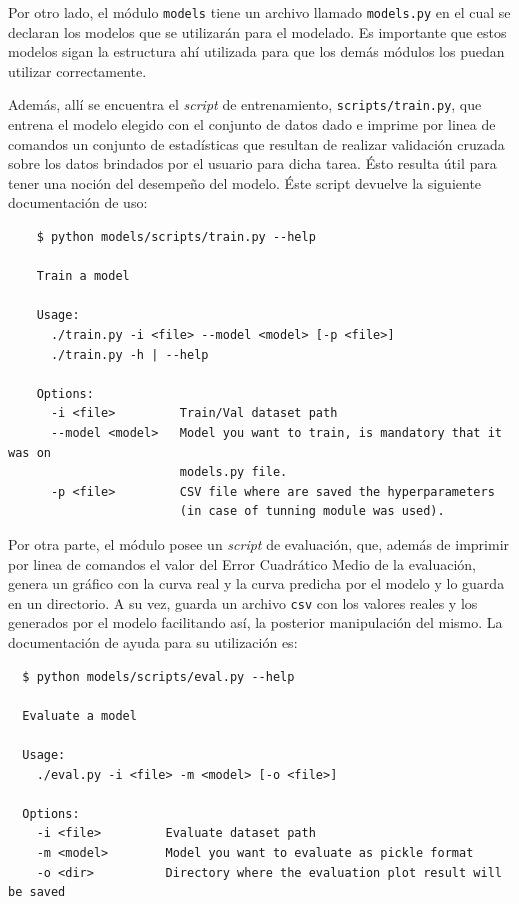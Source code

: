 \begin{appendix}
\begin{lstlisting}
    \end{lstlisting}


  \par Por otro lado, el módulo \verb|models| tiene un archivo llamado
    \verb|models.py| en el cual se declaran los modelos
    que se utilizarán para el modelado. Es importante que estos modelos
    sigan la estructura ahí utilizada para que los demás módulos los
    puedan utilizar correctamente.

  \par Además, allí se encuentra el \textit{script} de entrenamiento,
    \verb|scripts/train.py|, que entrena el modelo elegido con el conjunto
    de datos dado e imprime por linea de comandos un conjunto de
    estadísticas que resultan de realizar validación cruzada sobre
    los datos brindados por el usuario para dicha tarea. Ésto resulta útil
    para tener una noción del desempeño del modelo.
    Éste script devuelve la siguiente documentación de uso:
    \begin{lstlisting}
    $ python models/scripts/train.py --help

    Train a model

    Usage:
      ./train.py -i <file> --model <model> [-p <file>]
      ./train.py -h | --help

    Options:
      -i <file>         Train/Val dataset path
      --model <model>   Model you want to train, is mandatory that it was on
                        models.py file.
      -p <file>         CSV file where are saved the hyperparameters
                        (in case of tunning module was used).
    \end{lstlisting}

  \par Por otra parte, el módulo posee un \textit{script} de evaluación,
  que, además de imprimir por linea de comandos el valor del Error Cuadrático Medio de la
  evaluación, genera un gráfico con la curva real y la curva predicha
  por el modelo y lo guarda en un directorio. A su vez, guarda un
  archivo \verb|csv| con los valores reales y los generados por el modelo
  facilitando así, la posterior manipulación del mismo.
  La documentación de ayuda para su utilización es:
  \begin{lstlisting}
  $ python models/scripts/eval.py --help

  Evaluate a model

  Usage:
    ./eval.py -i <file> -m <model> [-o <file>]

  Options:
    -i <file>         Evaluate dataset path
    -m <model>        Model you want to evaluate as pickle format
    -o <dir>          Directory where the evaluation plot result will be saved


\end{lstlisting}
\end{appendix}
